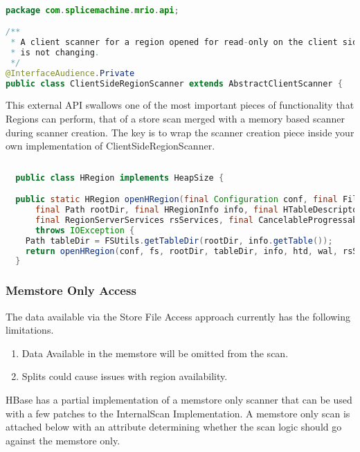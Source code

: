 \begin{lstlisting}[language=java]

package com.splicemachine.mrio.api;

/**
 * A client scanner for a region opened for read-only on the client side. Assumes region data
 * is not changing.
 */
@InterfaceAudience.Private
public class ClientSideRegionScanner extends AbstractClientScanner {

\end{lstlisting}

This external API swallows one of the most important pieces of functionality
that Regions can perform, that of a store scan merged with a memory based
scanner during scanner creation.  The key is to wrap the scanner creation piece
inside your own implementation of ClientSideRegionScanner.  

\begin{lstlisting}[language=java]
  
  public class HRegion implements HeapSize {

  public static HRegion openHRegion(final Configuration conf, final FileSystem fs,
      final Path rootDir, final HRegionInfo info, final HTableDescriptor htd, final HLog wal,
      final RegionServerServices rsServices, final CancelableProgressable reporter)
      throws IOException {
    Path tableDir = FSUtils.getTableDir(rootDir, info.getTable());
    return openHRegion(conf, fs, rootDir, tableDir, info, htd, wal, rsServices, reporter);
  }
\end{lstlisting}

\subsubsection{Memstore Only Access}
The data available via the Store File Access approach currently has the
following limitations.

\begin{enumerate}
	\item Data Available in the memstore will be omitted from the scan.
	\item Splits could cause issues with region availability.
\end{enumerate}

HBase has a partial implementation of a memstore only scanner that can be used
with a few patches to the InternalScan Implementation.  A memstore only scan is
attached below with an attribute determining whether the scan logic should go
against the memstore only.

